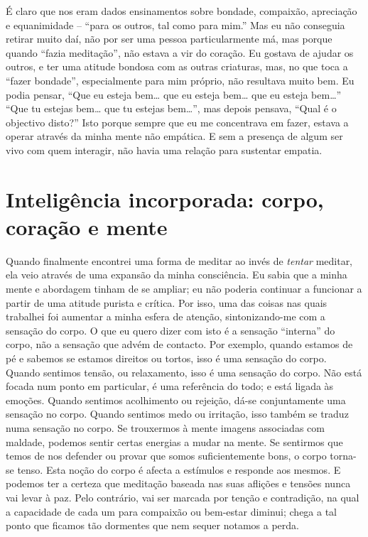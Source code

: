 É claro que nos eram dados ensinamentos sobre bondade, compaixão,
apreciação e equanimidade -- “para os outros, tal como para mim.” Mas eu
não conseguia retirar muito daí, não por ser uma pessoa particularmente
má, mas porque quando “fazia meditação”, não estava a vir do coração. Eu
gostava de ajudar os outros, e ter uma atitude bondosa com as outras
criaturas, mas, no que toca a “fazer bondade”, especialmente para mim
próprio, não resultava muito bem. Eu podia pensar, “Que eu esteja bem\ldots{}
que eu esteja bem\ldots{} que eu esteja bem\ldots{}” “Que tu estejas bem\ldots{} que tu
estejas bem\ldots{}”, mas depois pensava, “Qual é o objectivo disto?” Isto
porque sempre que eu me concentrava em fazer, estava a operar através da
minha mente não empática. E sem a presença de algum ser vivo com quem
interagir, não havia uma relação para sustentar empatia.

\section{Inteligência incorporada: corpo, coração e
mente}

Quando finalmente encontrei uma forma de meditar ao invés de
\emph{tentar} meditar, ela veio através de uma expansão da minha
consciência. Eu sabia que a minha mente e abordagem tinham de se
ampliar; eu não poderia continuar a funcionar a partir de uma atitude
purista e crítica. Por isso, uma das coisas nas quais trabalhei foi
aumentar a minha esfera de atenção, sintonizando-me com a sensação do
corpo. O que eu quero dizer com isto é a sensação “interna” do corpo,
não a sensação que advém de contacto. Por exemplo, quando estamos de pé
e sabemos se estamos direitos ou tortos, isso é uma sensação do corpo.
Quando sentimos tensão, ou relaxamento, isso é uma sensação do corpo.
Não está focada num ponto em particular, é uma referência do todo; e
está ligada às emoções. Quando sentimos acolhimento ou rejeição, dá-se
conjuntamente uma sensação no corpo. Quando sentimos medo ou irritação,
isso também se traduz numa sensação no corpo. Se trouxermos à mente
imagens associadas com maldade, podemos sentir certas energias a mudar
na mente. Se sentirmos que temos de nos defender ou provar que somos
suficientemente bons, o corpo torna-se tenso. Esta noção do corpo é
afecta a estímulos e responde aos mesmos. E podemos ter a certeza que
meditação baseada nas suas aflições e tensões nunca vai levar à paz.
Pelo contrário, vai ser marcada por tenção e contradição, na qual a
capacidade de cada um para compaixão ou bem-estar diminui; chega a tal
ponto que ficamos tão dormentes que nem sequer notamos a perda.

